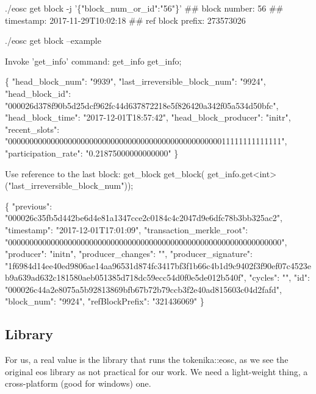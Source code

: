 \begin{DoxyCode}
./eosc get block -j '\{"block\_num\_or\_id":"56"\}'
##         block number: 56
##            timestamp: 2017-11-29T10:02:18
##     ref block prefix: 273573026
\end{DoxyCode}
 
\begin{DoxyCode}
./eosc get block --example
\end{DoxyCode}
 
\begin{DoxyCode}
Invoke 'get\_info' command:
get\_info get\_info;

\{
    "head\_block\_num": "9939",
    "last\_irreversible\_block\_num": "9924",
    "head\_block\_id": "000026d378f90b5d25dcf962fc44d637872218e5f826420a342f05a534d50bfc",
    "head\_block\_time": "2017-12-01T18:57:42",
    "head\_block\_producer": "initr",
    "recent\_slots": "0000000000000000000000000000000000000000000000000011111111111111",
    "participation\_rate": "0.21875000000000000"
\}


Use reference to the last block:
get\_block get\_block(
  get\_info.get<int>("last\_irreversible\_block\_num"));

\{
    "previous": "000026c35fb5d442be6d4e81a1347cce2c0184c4c2047d9e6dfc78b3bb325ac2",
    "timestamp": "2017-12-01T17:01:09",
    "transaction\_merkle\_root": "0000000000000000000000000000000000000000000000000000000000000000",
    "producer": "initn",
    "producer\_changes": "",
    "producer\_signature":
       "1f6984d14ee40ed9806ae14aa96531d874fc3417bf3f1b66c4b1d9c9402f3f90ef07c4523eb9a639ad632c181580aeb051385d718dc59ecc54d0f0e5de012b540f",
    "cycles": "",
    "id": "000026c44a2e8075a5b92813869bfb67b72b79ccb3f2e40ad815603c04d2fafd",
    "block\_num": "9924",
    "refBlockPrefix": "321436069"
\}
\end{DoxyCode}
 \subsection*{Library}

For us, a real value is the library that runs the tokenika\+::eosc, as we see the original eos library as not practical for our work. We need a light-\/weight thing, a cross-\/platform (good for windows) one.

